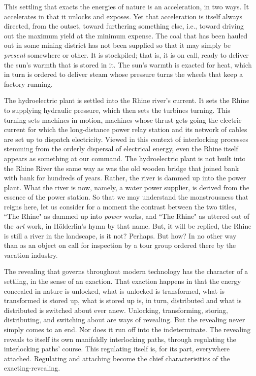 \documentclass[paper=a4, fontsize=11pt,twoside]{scrartcl}
\begin{document}
This settling that exacts the energies of nature is an acceleration, in two ways. It accelerates in that it unlocks and exposes. Yet that acceleration is itself always directed, from the outset, toward furthering something else, i.e., toward driving out the maximum yield at the minimum expense. The coal that has been hauled out in some mining district has not been supplied so that it may simply be \textit{present} somewhere or other. It is stockpiled; that is, it is on call, ready to deliver the sun's warmth that is stored in it. The sun's warmth is exacted for heat, which in turn is ordered to deliver steam whose pressure turns the wheels that keep a factory running.

The hydroelectric plant is settled into the Rhine river's current. It sets the Rhine to supplying hydraulic pressure, which then sets the turbines turning. This turning sets machines in motion, machines whose thrust gets going the electric current for which the long-distance power relay station and its network of cables are set up to dispatch electricity. Viewed in this context of interlocking processes stemming from the orderly dispersal of electrical energy, even the Rhine itself appears as something at our command. The hydroelectric plant is not built into the Rhine River the same way as was the old wooden bridge that joined bank with bank for hundreds of years. Rather, the river is dammed up into the power plant. What the river is now, namely, a water power supplier, is derived from the essence of the power station. So that we may understand the monstrousness that reigns here, let us consider for a moment the contrast between the two titles, ``The Rhine" as dammed up into \textit{power} works, and ``The Rhine" as uttered out of the \textit{art} work, in H{\"o}lderlin's hymn by that name. But, it will be replied, the Rhine is still a river in the landscape, is it not? Perhaps. But how? In no other way than as an object on call for inspection by a tour group ordered there by the vacation industry.

The revealing that governs throughout modern technology has the character of a settling, in the sense of an exaction. That exaction happens in that the energy concealed in nature is unlocked, what is unlocked is transformed, what is transformed is stored up, what is stored up is, in turn, distributed and what is distributed is switched about ever anew. Unlocking, transforming, storing, distributing, and switching about are ways of revealing. But the revealing never simply comes to an end. Nor does it run off into the indeterminate. The revealing reveals to itself its own manifoldly interlocking paths, through regulating the interlocking paths' course. This regulating itself is, for its part, everywhere attached. Regulating and attaching become the chief characterisitics of the exacting-revealing.
\end{document}
